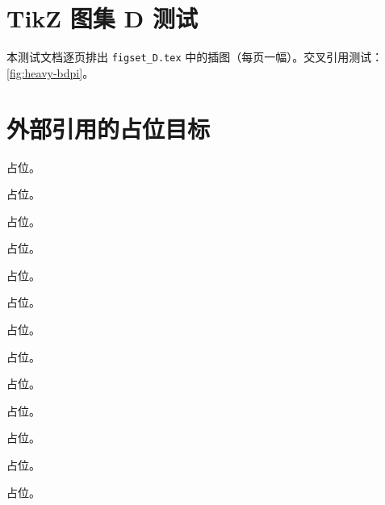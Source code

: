 

\chapter{TikZ 图集 D 测试}
本测试文档逐页排出 \texttt{figset\_D.tex} 中的插图（每页一幅）。交叉引用测试：\cref{fig:heavy-bdpi}。
\clearpage
\clearpage
\chapter{外部引用的占位目标}
\begin{assumption}[占位]\label{asm:appN-ir-regulator}占位。\end{assumption}
\begin{assumption}[占位]\label{asm:intro-growth}占位。\end{assumption}
\begin{assumption}[占位]\label{asm:intro-np-ope}占位。\end{assumption}
\begin{assumption}[占位]\label{asm:lamet-gap}占位。\end{assumption}
\begin{assumption}[占位]\label{asm:lamet-large-z}占位。\end{assumption}
\begin{assumption}[占位]\label{asm:lamet-ope}占位。\end{assumption}
\begin{assumption}[占位]\label{asm:lamet-twist4}占位。\end{assumption}
\begin{assumption}[占位]\label{asm:lamet-uniform}占位。\end{assumption}
\begin{assumption}[占位]\label{asm:yzliu-heavy-pair}占位。\end{assumption}
\begin{assumption}[占位]\label{asm:yzliu-lightcone-uniform}占位。\end{assumption}
\begin{assumption}[占位]\label{asm:yzliu-wightman-pt}占位。\end{assumption}
\begin{conjecture}[占位]\label{conj:lamet-decay-qcd}占位。\end{conjecture}
\begin{conjecture}[占位]\label{conj:power-renormalon-ht}占位。\end{conjecture}
